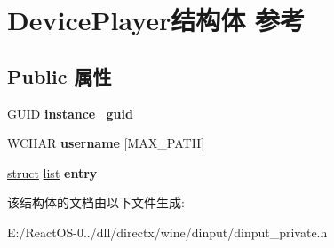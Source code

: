 \hypertarget{struct_device_player}{}\section{Device\+Player结构体 参考}
\label{struct_device_player}
\subsection*{Public 属性}
\begin{DoxyCompactItemize}
\item 
\mbox{\label{struct_device_player_a73c75f74ea6ee64185a390b8c7b491e3}} 
\hyperlink{interface_g_u_i_d}{G\+U\+ID} {\bfseries instance\+\_\+guid}
\item 
\mbox{\label{struct_device_player_a15f9db7a841d418da625890623bd938c}} 
W\+C\+H\+AR {\bfseries username} \mbox{[}M\+A\+X\+\_\+\+P\+A\+TH\mbox{]}
\item 
\mbox{\label{struct_device_player_af998db6e7a843397d3bb784c5b9c6547}} 
\hyperlink{interfacestruct}{struct} \hyperlink{classlist}{list} {\bfseries entry}
\end{DoxyCompactItemize}


该结构体的文档由以下文件生成\+:\begin{DoxyCompactItemize}
\item 
E\+:/\+React\+O\+S-\/0../dll/directx/wine/dinput/dinput\+\_\+private.\+h\end{DoxyCompactItemize}

